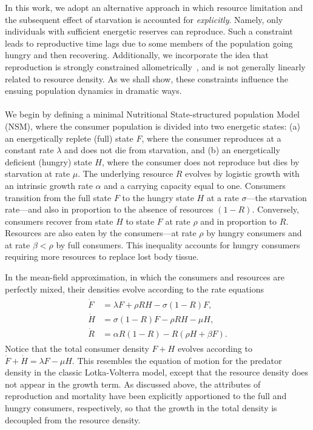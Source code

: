 \documentclass{pnastwo}
\begin{document}
\begin{article}
In this work, we adopt an alternative approach in which resource limitation
and the subsequent effect of starvation is accounted for \emph{explicitly}.
Namely, only individuals with sufficient energetic reserves can reproduce.
Such a constraint leads to reproductive time lags due to some members of the
population going hungry and then recovering.  Additionally, we incorporate the
idea that reproduction is strongly constrained
allometrically~\cite{Kempes:2012hy}, and is not generally linearly related to
resource density.  As we shall show, these constraints influence the ensuing
population dynamics in dramatic ways.
\\

\\
We begin by defining a minimal Nutritional State-structured population Model
(NSM), where the consumer population is divided into two energetic states:
(a) an energetically replete (full) state $F$, where the consumer reproduces
at a constant rate $\lambda$ and does not die from starvation, and (b) an
energetically deficient (hungry) state $H$, where the consumer does not
reproduce but dies by starvation at rate $\mu$.  The underlying resource $R$ evolves by
logistic growth with an intrinsic growth rate $\alpha$ and a carrying
capacity equal to one.  Consumers transition from the full state $F$ to the
hungry state $H$ at a rate $\sigma$---the starvation rate---and also in
proportion to the absence of resources $(1-R)$.  Conversely, consumers
recover from state $H$ to state $F$ at rate $\rho$ and in proportion to $R$.
Resources are also eaten by the consumers---at rate $\rho$ by hungry
consumers and at rate $\beta<\rho$ by full consumers.  This inequality
accounts for hungry consumers requiring more resources to replace lost body
tissue.

In the mean-field approximation, in which the consumers and resources are
perfectly mixed, their densities evolve according to the rate equations
\begin{eqnarray} 
\label{eq:system}
\begin{split}
\dot{F} &= \lambda F + \rho RH - \sigma (1-R)F,  \\
\dot{H} &= \sigma (1-R)F - \rho RH - \mu H,  \\
\dot{R} &= \alpha R(1-R) - R(\rho H+ \beta F).
\end{split}
\end{eqnarray}
Notice that the total consumer density $F+H$ evolves according to
$\dot{F}+\dot{H}=\lambda F-\mu H$.  This resembles the equation of motion for
the predator density in the classic Lotka-Volterra model, except that the
resource density does not appear in the growth term.  As discussed above, the
attributes of reproduction and mortality have been explicitly apportioned to
the full and hungry consumers, respectively, so that the growth in the total
density is decoupled from the resource density.


\end{article}
\end{document}
